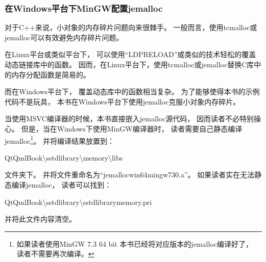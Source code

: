 \subsubsection{
在Windows平台下MinGW配置jemalloc
}\label{ss000310}


对于C++来说，小对象的内存碎片问题向来很棘手。
一般而言，使用tcmalloc或jemalloc可以有效避免内存碎片问题。

在Linux平台或类似平台下，
可以使用“LD\underline{\hspace{0.5em}}PRELOAD”或类似的技术轻松的覆盖动态链接库中的函数。
因而，在Linux平台下，使用tcmalloc或jemalloc替换C库中的内存分配函数是简易的。

而在Windows平台下，
覆盖动态库中的函数相当复杂。
为了能够使得本书的示例代码不是玩具，
本书在Windows平台下使用jemalloc克服小对象内存碎片。

当使用MSVC编译器的时候，本书直接嵌入jemalloc源代码，
因而读者不必特别操心。
但是，当在Windows下使用MinGW编译器时，
读者需要自己静态编译jemalloc\footnote{
如果读者使用MinGW 7.3 64 bit
本书已经将对应版本的jemalloc编译好了，
读者不需要再次编译。
}。
并将编译结果放置到：
\begin{littlelongworld}
QtQmlBook\textbackslash{}sstd\underline{\hspace{0.5em}}library\textbackslash{}memory\textbackslash{}libs
\end{littlelongworld}
文件夹下。
并将文件重命名为“jemalloc\underline{\hspace{0.5em}}win64\underline{\hspace{0.5em}}mingw\underline{\hspace{0.5em}}730.a”。
如果读者实在无法静态编译jemalloc，
读者可以找到：
\begin{littlelongworld}
QtQmlBook\textbackslash{}sstd\underline{\hspace{0.5em}}library\textbackslash{}\underline{\hspace{0.5em}}sstd\underline{\hspace{0.5em}}library\underline{\hspace{0.5em}}memory.pri
\end{littlelongworld}
并将此文件内容清空。





















